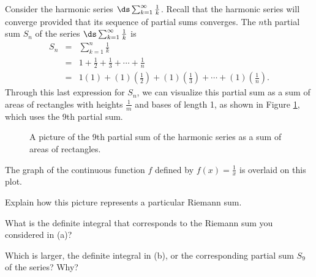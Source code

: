 \begin{activity} \label{8.3.Act4} Consider the harmonic series $\ds \sum_{k=1}^{\infty} \frac{1}{k}$. Recall that the harmonic series will converge provided that its sequence of partial sums converges. The $n$th partial sum $S_n$ of the series $\ds \sum_{k=1}^{\infty} \frac{1}{k}$ is
 \begin{eqnarray*}
 S_n & = & \sum_{k=1}^{n} \frac{1}{k} \\
 	& = & 1 + \frac{1}{2} + \frac{1}{3} + \cdots + \frac{1}{n} \\
 	& = & 1(1) + (1)\left(\frac{1}{2}\right) + (1)\left(\frac{1}{3}\right) + \cdots + (1)\left(\frac{1}{n}\right).
\end{eqnarray*}
Through this last expression for $S_n$, we can visualize this partial sum as a sum of areas of rectangles with heights $\frac{1}{m}$ and bases of length 1, as shown in Figure \ref{F:8.3.4_Integral_Test}, which uses the 9th partial sum.
\begin{figure}[h]
\begin{center}
\caption{A picture of the 9th partial sum of the harmonic series as a sum of areas of rectangles.}
\label{F:8.3.4_Integral_Test}
\end{center}
\end{figure}
The graph of the continuous function $f$ defined by $f(x) = \frac{1}{x}$ is overlaid on this plot. 
\ba
\item Explain how this picture represents a particular Riemann sum.
\item What is the definite integral that corresponds to the Riemann sum you considered in (a)?
\item Which is larger, the definite integral in (b), or the corresponding partial sum $S_9$ of the series? Why?


\end{activity}
